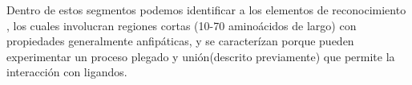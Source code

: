 
Dentro de estos segmentos podemos identificar a los elementos de reconocimiento \cite{mohan2006analysis,vacic2007characterization,oldfield2005coupled}, los cuales involucran regiones cortas (10-70 aminoácidos de largo) 
con propiedades generalmente anfipáticas, y se caracterízan porque pueden experimentar un proceso plegado y unión(descrito previamente) que permite la interacción con ligandos.  
% 



